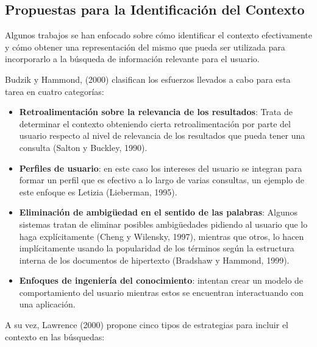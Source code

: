 \subsection {Propuestas para la Identificación del Contexto} 

Algunos trabajos se han enfocado sobre cómo identificar el contexto efectivamente y cómo obtener una representación del mismo que pueda ser utilizada para incorporarlo a la búsqueda de información relevante para el usuario.

Budzik y Hammond, (2000) clasifican los esfuerzos llevados a cabo para esta tarea en cuatro categorías:

\begin{itemize}
\item \textbf{Retroalimentación sobre la relevancia de los resultados}: Trata
de determinar el contexto obteniendo cierta retroalimentación por parte del
usuario respecto al nivel
de relevancia de los resultados que pueda tener una consulta (Salton y
Buckley, 1990).


\item \textbf{Perfiles de usuario}: en este caso los intereses del usuario se
integran para formar un
perfil que es efectivo a lo largo de varias consultas, un ejemplo de este
enfoque es
Letizia (Lieberman, 1995).

\item \textbf{Eliminación de ambigüedad en el sentido de las palabras}: Algunos
sistemas tratan
de eliminar posibles ambigüedades pidiendo al usuario que lo haga explícitamente
(Cheng y Wilensky, 1997), mientras que otros, lo hacen implícitamente usando la
popularidad de los términos según la estructura interna de los documentos de
hipertexto (Bradshaw y Hammond, 1999).

\item \textbf{Enfoques de ingeniería del conocimiento}: intentan crear un modelo
de
comportamiento del usuario mientras estos se encuentran interactuando con una
aplicación.
\end{itemize}

A su vez, Lawrence (2000) propone cinco tipos de estrategias para incluir el
contexto en
las búsquedas:

